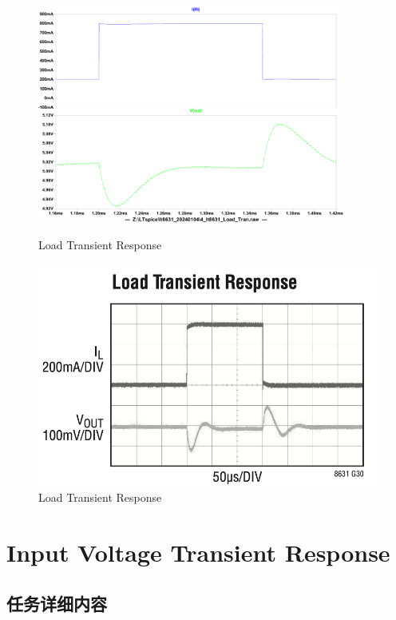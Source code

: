 \documentclass[lang=cn,10pt]{elegantbook}
\begin{document}
\begin{figure}[htbp]
    \centering\begin{minipage}[t]{0.48\textwidth}
        \centering\includegraphics[page=1, width=0.9\textwidth]{figure/4_lt8631_Load_Tran_2.pdf}
        \caption{Load Transient Response}
    \end{minipage}
    \centering\begin{minipage}[t]{0.48\textwidth}
        \centering\includegraphics[width=0.9\linewidth]{figure/datasheet_G30.png}
        \caption{Load Transient Response}
    \end{minipage}
\end{figure}

\section{Input Voltage Transient Response}

\subsection{任务详细内容}
\end{document}
